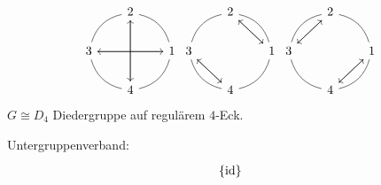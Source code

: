 \documentclass[a4paper]{report}
\begin{document}
\begin{bsp}
\begin{enumerate}[(a)]
\[                                                       \begin{tikzcd}[column sep = 20]
                                             & 2 \arrow[ld, no head, bend right] \arrow[dd] &                                              \\
3 \arrow[rd, no head, bend right] \arrow[rr] &                                              & 1 \arrow[lu, no head, bend right] \arrow[ll] \\
                                             & 4 \arrow[ru, no head, bend right] \arrow[uu] &
                                           \end{tikzcd}
                                           \begin{tikzcd}[column sep = 20]
                                             & 2 \arrow[ld, no head, bend right] \arrow[rd] &                                              \\
3 \arrow[rd, no head, bend right] \arrow[rd] &                                              & 1 \arrow[lu, no head, bend right] \arrow[lu] \\
                                             & 4 \arrow[ru, no head, bend right] \arrow[lu] &
                                           \end{tikzcd}
                                           \begin{tikzcd}[column sep = 20]
                                             & 2 \arrow[ld, no head, bend right] \arrow[ld] &                                              \\
3 \arrow[rd, no head, bend right] \arrow[ru] &                                              & 1 \arrow[lu, no head, bend right] \arrow[ld] \\
                                             & 4 \arrow[ru, no head, bend right] \arrow[ru] &
\end{tikzcd}
          \]
          $G \cong D_{4}$ Diedergruppe auf regulärem $4$-Eck.
  \end{enumerate}
  \item Untergruppenverband:
                                                     \[\begin{tikzcd}
                                                         &                                                          & \{\mathrm{id}\}                                                &                                                          &                                                     \\

\end{tikzcd}\]
\end{bsp}
\end{document}
